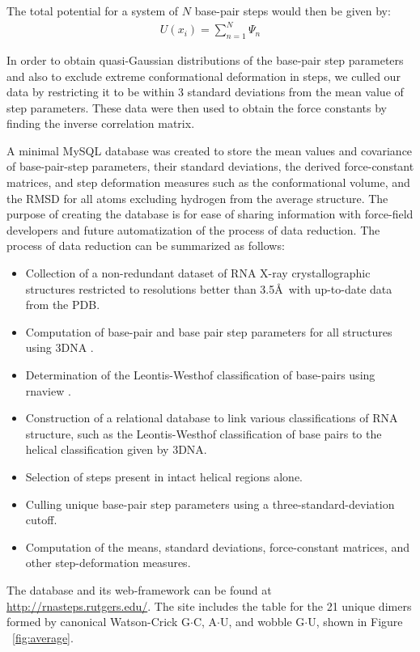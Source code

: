 The total potential for a system  of $N$ base-pair steps would then be
given by:
\begin{gather}
U(x_{i}) = \sum_{n=1}^{N} \Psi_{n}
\end{gather}

In order to obtain  quasi-Gaussian distributions of the base-pair step
parameters and  also to exclude extreme  conformational deformation in
steps, we  culled our data by  restricting it to be  within 3 standard
deviations from  the mean  value of step  parameters. These  data were
then  used  to obtain  the  force  constants  by finding  the  inverse
correlation matrix.

A  minimal MySQL database  was created  to store  the mean  values and
covariance  of base-pair-step  parameters, their  standard deviations,
the  derived force-constant  matrices, and  step  deformation measures
such  as  the  conformational  volume,  and the  RMSD  for  all  atoms
excluding hydrogen from the average structure. The purpose of creating
the  database is  for  ease of  sharing  information with  force-field
developers and future automatization of the process of data reduction.
The process of data reduction can be summarized as follows:
\begin{itemize}
\item{Collection   of   a   non-redundant   dataset   of   RNA   X-ray
crystallographic  structures  restricted  to resolutions  better  than
3.5\AA~with up-to-date data from the PDB.}
\item{Computation of  base-pair and base pair step  parameters for all
    structures using 3DNA \cite{lu2003}.}
\item{Determination   of   the   Leontis-Westhof   classification   of
base-pairs using rnaview \cite{yang2003}.}
\item{Construction   of  a   relational  database   to   link  various
classifications  of   RNA  structure,  such   as  the  Leontis-Westhof
classification of  base pairs to  the helical classification  given by
3DNA.}
\item{Selection of steps present in intact helical regions alone.}
\item{Culling    unique   base-pair    step    parameters   using    a
    three-standard-deviation cutoff.}
\item{Computation  of the  means, standard  deviations, force-constant
matrices, and other step-deformation measures.}
\end{itemize}  

The    database   and    its   web-framework    can   be    found   at
\url{http://rnasteps.rutgers.edu/}.  The site  includes the  table for
the  21  unique dimers  formed  by  canonical Watson-Crick  G$\cdot$C,
A$\cdot$U, and wobble G$\cdot$U, shown in Figure ~\ref{fig:average}.

